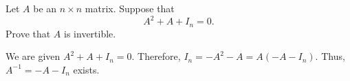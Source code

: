 \documentclass{ximera}
\begin{document}
\begin{exercise} \label{c10.2.6}
Let $A$ be an $n\times n$ matrix.  Suppose that 
\[
A^2 + A + I_n = 0.
\]
Prove that $A$ is invertible.

\begin{solution}

We are given $A^2 + A + I_n = 0$.  Therefore, $I_n = -A^2 - A =
A(-A - I_n)$.  Thus, $A^{-1} = -A - I_n$ exists.

\end{solution}
\end{exercise}
\end{document}
